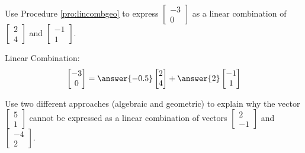 \documentclass{ximera}
\begin{document}
\begin{problem}
Use Procedure \ref{pro:lincombgeo} to express $\begin{bmatrix}-3\\0\end{bmatrix}$ as a linear combination of $\begin{bmatrix}2\\4\end{bmatrix}$ and $\begin{bmatrix}-1\\1\end{bmatrix}$.

Linear Combination:
$$\begin{bmatrix}-3\\0\end{bmatrix}=\answer{-0.5}\begin{bmatrix}2\\4\end{bmatrix}+\answer{2}\begin{bmatrix}-1\\1\end{bmatrix}$$
\end{problem}

\begin{problem}
Use two different approaches (algebraic and geometric) to explain why the vector $\begin{bmatrix}5\\1\end{bmatrix}$ cannot be expressed as a linear combination of vectors $\begin{bmatrix}2\\-1\end{bmatrix}$ and $\begin{bmatrix}-4\\2\end{bmatrix}$.
\end{problem}
\end{document}
